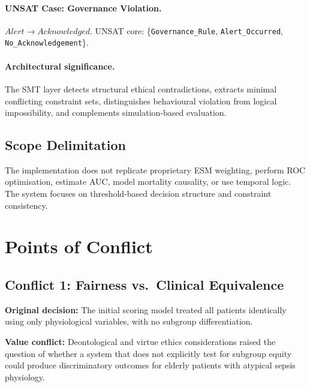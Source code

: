 \documentclass[]{UCD_CS_41820_Report}
\begin{document}
\paragraph{UNSAT Case: Governance Violation.}
$Alert \rightarrow Acknowledged$. UNSAT core: \{\texttt{Governance\_Rule},
\texttt{Alert\_Occurred}, \texttt{No\_Acknowledgement}\}.

\paragraph{Architectural significance.}
The SMT layer detects structural ethical contradictions, extracts minimal conflicting
constraint sets, distinguishes behavioural violation from logical impossibility,
and complements simulation-based evaluation.

\subsection{Scope Delimitation}

The implementation does not replicate proprietary ESM weighting, perform ROC
optimisation, estimate AUC, model mortality causality, or use temporal logic.
The system focuses on threshold-based decision structure and constraint consistency.

\section{Points of Conflict}

\subsection*{Conflict 1: Fairness vs.\ Clinical Equivalence}

\textbf{Original decision:} The initial scoring model treated all patients
identically using only physiological variables, with no subgroup differentiation.\par
\medskip
\textbf{Value conflict:} Deontological and virtue ethics considerations raised
the question of whether a system that does not explicitly test for subgroup equity
could produce discriminatory outcomes for elderly patients with atypical sepsis
physiology.\par
\medskip
\end{document}
